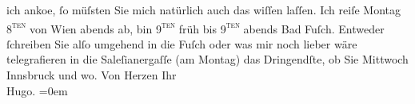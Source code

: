 \begin{ledgroupsized}[t]{13cm}
                    ich anko{\geminationm}e, ſo müſsten Sie mich natürlich auch das
                    wiſſen laſſen. Ich reiſe Montag 8\textsc{\textsuperscript{ten}} von Wien abends ab, bin 9\textsc{\textsuperscript{ten}}{ }früh bis 9\textsc{\textsuperscript{ten}}{ }abends{ }Bad Fuſch. Entweder ſchreiben Sie alſo umgehend
                    in die Fuſch oder was mir noch lieber wäre {\pb}telegrafieren in die Saleſianergaſſe (am Montag) das
                    Dringendſte, ob Sie Mittwoch{ }Innsbruck und wo.\pend
           \pstart
           Von Herzen Ihr{\\[\baselineskip]}\spacefill\mbox{Hugo.}\pend
           \leftskip=0em{}\endnumbering{}\end{ledgroupsized}  \newcommand{\dateiname}{L00831}\newcommand{\titel}{Hugo von Hofmannsthal an Arthur Schnitzler, 6. 8. [1898]}\newcommand{\editorInnen}{Martin Anton Müller und Gerd-Hermann Susen}
      
